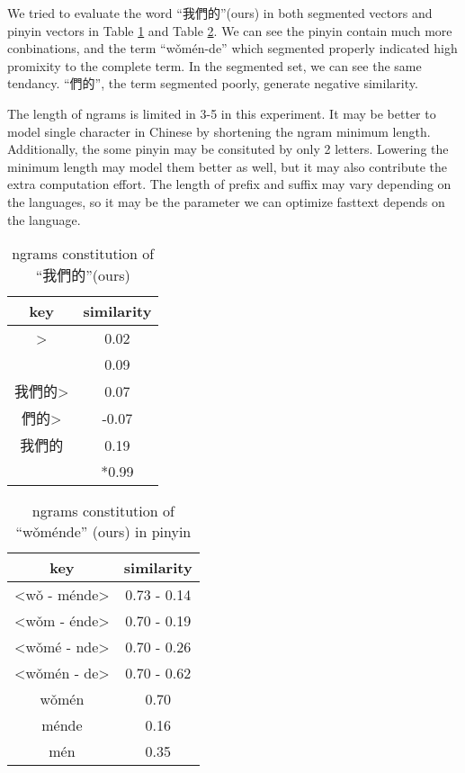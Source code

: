We tried to evaluate the word \enquote{我們的}(ours) in both segmented vectors and pinyin vectors in Table \ref{table:ngrams-seg} and Table \ref{table:ngrams-pinyin}. 
We can see the pinyin contain much more conbinations, and the term \enquote{wǒmén-de} which segmented properly indicated high promixity to the complete term. 
In the segmented set, we can see the same tendancy. \enquote{們的}, the term segmented poorly, generate negative similarity. 

The length of ngrams is limited in 3-5 in this experiment. It may be better to model single character in Chinese by shortening the ngram minimum length.
Additionally, the some pinyin may be consituted by only 2 letters.  Lowering the minimum length may model them better as well, but it may also contribute the extra computation effort.
The length of prefix and suffix may vary depending on the languages, so it may be the parameter we can optimize fasttext depends on the language.

\begin{table}[]
\centering
\caption{ngrams constitution of \enquote{我們的}(ours)}
\label{table:ngrams-seg}
\begin{tabular}{|c|c|}
\hline
 key  &  similarity \\
\hline
{}\textgreater     &  0.02 \\
     &  0.09 \\
我們的\textgreater     &  0.07 \\
們的\textgreater     &  -0.07 \\
我們的     & 0.19   \\
     &  *0.99   \\   
\hline
\end{tabular}
\end{table}

\begin{table}[]
\centering
\caption{ngrams constitution of \enquote{wǒménde} (ours) in pinyin}
\label{table:ngrams-pinyin}
\begin{tabular}{|c|c|}
\hline
 key  &  similarity \\
\hline
\textless wǒ -  ménde\textgreater      &  0.73 - 0.14 \\
\textless wǒm -  énde\textgreater      &  0.70 - 0.19 \\
\textless wǒmé - nde\textgreater     &  0.70 - 0.26 \\
\textless wǒmén - de\textgreater      &  0.70 - 0.62\\
wǒmén      &  0.70 \\
  ménde     & 0.16   \\
mén     &  0.35   \\   
\hline
\end{tabular}
\end{table}


